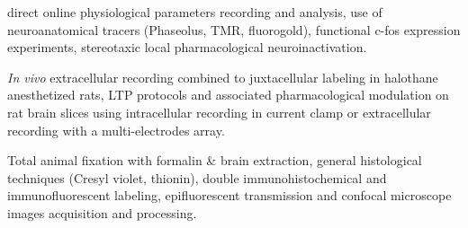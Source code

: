  direct online physiological parameters recording and analysis, use of neuroanatomical tracers (Phaseolus, TMR, fluorogold), functional c-fos expression experiments, stereotaxic local pharmacological neuroinactivation. 

 \textit{In vivo} extracellular recording combined to juxtacellular labeling in halothane anesthetized rats, LTP protocols and associated pharmacological modulation on rat brain slices using intracellular recording in current clamp or extracellular recording with a multi-electrodes array. 

 Total animal fixation with formalin \& brain extraction, general histological techniques (Cresyl violet, thionin), double immunohistochemical and immunofluorescent labeling, epifluorescent transmission and confocal microscope images acquisition and processing.
